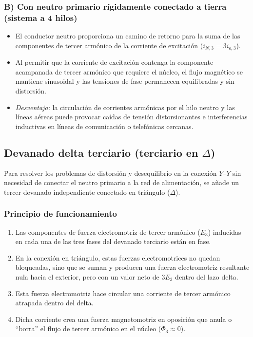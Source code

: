 \documentclass[12pt]{article}
\begin{document}
\subsubsection*{B) Con neutro primario r\'igidamente conectado a tierra (sistema a 4 hilos)}
\begin{itemize}
    \item El conductor neutro proporciona un camino de retorno para la suma de las componentes de tercer arm\'onico de la corriente de excitaci\'on ($i_{N,3}=3i_{o,3}$).
    \item Al permitir que la corriente de excitaci\'on contenga la componente acampanada de tercer arm\'onico que requiere el n\'ucleo, el flujo magn\'etico se mantiene sinusoidal y las tensiones de fase permanecen equilibradas y sin distorsi\'on.
    \item \textit{Desventaja:} la circulaci\'on de corrientes arm\'onicas por el hilo neutro y las l\'ineas a\'ereas puede provocar ca\'idas de tensi\'on distorsionantes e interferencias inductivas en l\'ineas de comunicaci\'on o telef\'onicas cercanas.
\end{itemize}

\subsection{Devanado delta terciario (terciario en $\Delta$)}

Para resolver los problemas de distorsi\'on y desequilibrio en la conexi\'on $Y$--$Y$ sin necesidad de conectar el neutro primario a la red de alimentaci\'on, se a\~nade un tercer devanado independiente conectado en tri\'angulo ($\Delta$).

\subsubsection*{Principio de funcionamiento}
\begin{enumerate}
    \item Las componentes de fuerza electromotriz de tercer arm\'onico ($E_3$) inducidas en cada una de las tres fases del devanado terciario est\'an en fase.
    \item En la conexi\'on en tri\'angulo, estas fuerzas electromotrices no quedan bloqueadas, sino que se suman y producen una fuerza electromotriz resultante nula hacia el exterior, pero con un valor neto de $3E_3$ dentro del lazo delta.
    \item Esta fuerza electromotriz hace circular una corriente de tercer arm\'onico atrapada dentro del delta.
    \item Dicha corriente crea una fuerza magnetomotriz en oposici\'on que anula o ``borra'' el flujo de tercer arm\'onico en el n\'ucleo ($\Phi_3\approx 0$).
\end{enumerate}
\end{document}
